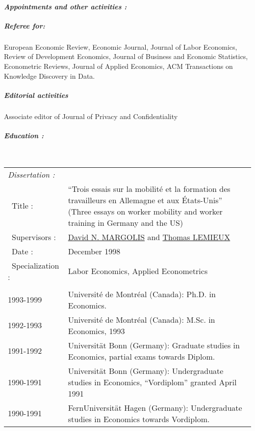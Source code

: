 \documentclass[10pt,letterpaper]{report}
\begin{document}
\paragraph{\it \bf Appointments and other activities :}%
\subparagraph{ Referee for:}
  European Economic Review,  Economic Journal, Journal of Labor
  Economics, Review of Development Economics, Journal of Business and Economic
  Statistics, Econometric Reviews, Journal of Applied Economics, ACM
  Transactions on Knowledge Discovery in Data.

\subparagraph{Editorial activities}
Associate editor of Journal of Privacy and Confidentiality

  
\paragraph{\it \bf Education :}
\ \\
\begin{tabular}{lp{4in}}
\it Dissertation : \\
\ Title :&``Trois essais sur la mobilit\'e et la formation des travailleurs en Allemagne et aux
\'Etats-Unis'' (Three essays on worker mobility and worker training in
Germany and the US)\\
\ Supervisors : &\href{mailto:margolis@univ-paris1.fr}{David N. MARGOLIS} 
                  and \href{mailto:tlemieux@interchange.ubc.ca}{Thomas LEMIEUX}\\
\ Date : & December 1998\\
\ Specialization : &Labor Economics, Applied Econometrics \\
\\
1993-1999   &    Universit\'e de Montr\'eal (Canada): Ph.D. in Economics. \\
1992-1993   &    Universit\'e de Montr\'eal (Canada): M.Sc. in Economics, 1993 \\
1991-1992   &    Universität Bonn (Germany): Graduate studies in Economics, partial exams towards Diplom.     \\
1990-1991   &    Universität Bonn (Germany): Undergraduate studies in Economics, ``Vordiplom'' granted April 1991 \\
1990-1991   &    FernUniversität Hagen (Germany): Undergraduate studies in Economics towards Vordiplom. \\
\end{tabular}
\end{document}

